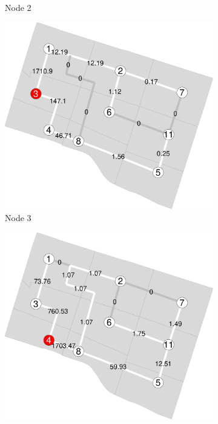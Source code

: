 \documentclass[]{elsarticle} %
\begin{document}
\begin{figure}
\begin{subfigure}{0.32\textwidth}
  \caption{Node 2}
\end{subfigure}
 \begin{subfigure}{0.32\textwidth}
  \centering
  \includegraphics[width=1\linewidth]{Plots/sp3.pdf}  
  \caption{Node 3}
\end{subfigure}
\begin{subfigure}{0.32\textwidth}
  \centering
  \includegraphics[width=1\linewidth]{Plots/sp4.pdf}  

\end{subfigure}
\end{figure}
\end{document}
